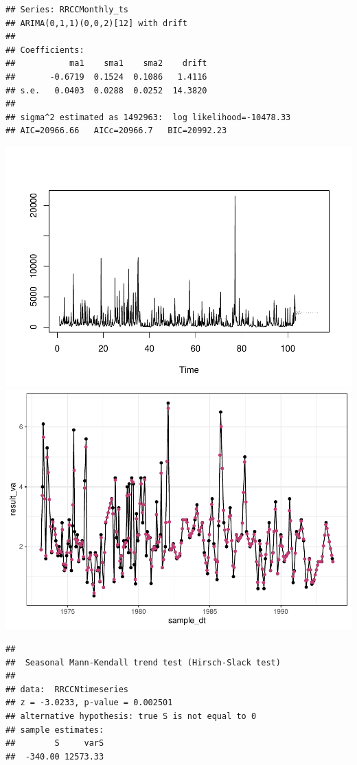 \documentclass[12pt,]{article}
\begin{document}
\begin{verbatim}
## Series: RRCCMonthly_ts 
## ARIMA(0,1,1)(0,0,2)[12] with drift 
## 
## Coefficients:
##           ma1    sma1    sma2    drift
##       -0.6719  0.1524  0.1086   1.4116
## s.e.   0.0403  0.0288  0.0252  14.3820
## 
## sigma^2 estimated as 1492963:  log likelihood=-10478.33
## AIC=20966.66   AICc=20966.7   BIC=20992.23
\end{verbatim}

\includegraphics{Project_Template_files/figure-latex/unnamed-chunk-6-25.pdf}
\includegraphics{Project_Template_files/figure-latex/unnamed-chunk-6-26.pdf}

\begin{verbatim}
## 
##  Seasonal Mann-Kendall trend test (Hirsch-Slack test)
## 
## data:  RRCCNtimeseries
## z = -3.0233, p-value = 0.002501
## alternative hypothesis: true S is not equal to 0
## sample estimates:
##        S     varS 
##  -340.00 12573.33
\end{verbatim}
\end{document}
